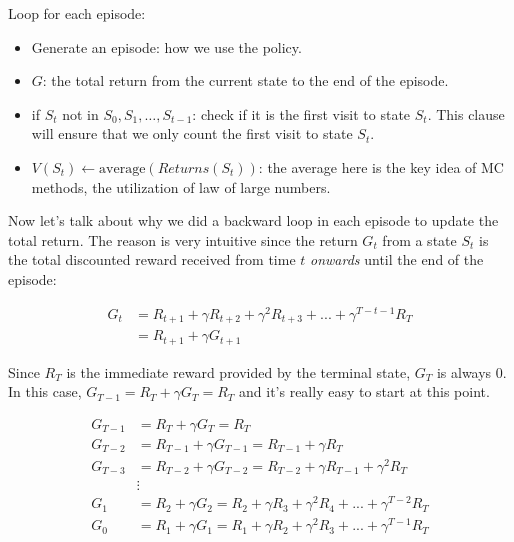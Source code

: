 \documentclass{article}
\begin{document}
Loop for each episode:
\begin{itemize}
    \item Generate an episode: how we use the policy.
    \item $G$:  the total return from the current state to the end of the episode.
    \item if $S_t$ not in $S_0, S_1, \dots, S_{t-1}$: check if it is the first visit to state $S_t$. This clause will ensure that we only count the first visit to state $S_t$.
    \item $V(S_t) \leftarrow \text{average}(Returns(S_t))$: the average here is the key idea of MC methods, the utilization of law of large numbers.
\end{itemize}

Now let's talk about why we did a backward loop in each episode to update the total return. The reason is very intuitive since the return $G_t$ from a state $S_t$ is the total discounted reward received from time $t$ \emph{onwards} until the end of the episode:

\begin{align*}
    G_t &= R_{t+1} + \gamma R_{t+2} + \gamma ^2 R_{t+3} + ... + \gamma ^{T-t-1} R_{T} \\
    &= R_{t+1} + \gamma G_{t+1}
\end{align*}

Since $R_T$ is the immediate reward provided by the terminal state, $G_T$ is always 0. In this case, $G_{T-1} = R_T + \gamma G_T = R_T$ and it's really easy to start at this point.

\begin{align*}
    G_{T-1} &= R_T + \gamma G_T = R_T\\
    G_{T-2} &= R_{T-1} + \gamma G_{T-1} = R_{T-1} + \gamma R_T\\
    G_{T-3} &= R_{T-2} + \gamma G_{T-2} = R_{T-2} + \gamma R_{T-1} + \gamma ^2 R_T\\
    &\vdots\\
    G_1 &= R_2 + \gamma G_2 = R_2 + \gamma R_3 + \gamma ^2 R_4 + ... + \gamma ^{T-2} R_T\\
    G_0 &= R_1 + \gamma G_1 = R_1 + \gamma R_2 + \gamma ^2 R_3 + ... + \gamma ^{T-1} R_T
\end{align*}
\end{document}
